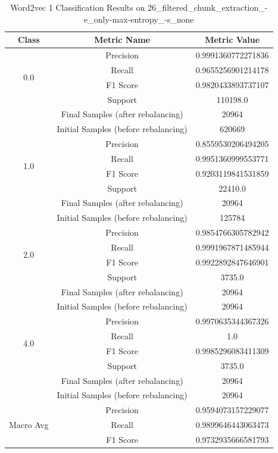 \begin{longtable}{|c|c|c|}
\caption{Word2vec 1 Classification Results on 26\_filtered\_chunk\_extraction\_-e\_only-max-entropy\_-s\_none} \label{tab:26_filtered_chunk_extraction_-e_only-max-entropy_-s_none_word2vec_1_classifiers_results} \\
\hline
Class & Metric Name & Metric Value \\
\hline
\multirow{4}{*}{0.0} & Precision & 0.9991360772271836 \\
 & Recall & 0.9655256901214178 \\
 & F1 Score & 0.9820433893737107 \\
 & Support & 110198.0 \\
 & Final Samples (after rebalancing) & 20964 \\
 & Initial Samples (before rebalancing) & 620669 \\
\hline
\multirow{4}{*}{1.0} & Precision & 0.8559530206494205 \\
 & Recall & 0.9951360999553771 \\
 & F1 Score & 0.9203119841531859 \\
 & Support & 22410.0 \\
 & Final Samples (after rebalancing) & 20964 \\
 & Initial Samples (before rebalancing) & 125784 \\
\hline
\multirow{4}{*}{2.0} & Precision & 0.9854766305782942 \\
 & Recall & 0.9991967871485944 \\
 & F1 Score & 0.9922892847646901 \\
 & Support & 3735.0 \\
 & Final Samples (after rebalancing) & 20964 \\
 & Initial Samples (before rebalancing) & 20964 \\
\hline
\multirow{4}{*}{4.0} & Precision & 0.9970635344367326 \\
 & Recall & 1.0 \\
 & F1 Score & 0.9985296083411309 \\
 & Support & 3735.0 \\
 & Final Samples (after rebalancing) & 20964 \\
 & Initial Samples (before rebalancing) & 20964 \\
\hline
\multirow{4}{*}{Macro Avg} & Precision & 0.9594073157229077 \\
 & Recall & 0.9899646443063473 \\
 & F1 Score & 0.9732935666581793 \\

\end{longtable}

